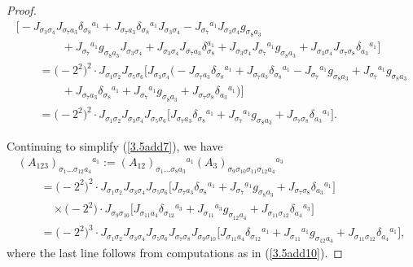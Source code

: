 \documentclass[10pt,a4paper]{amsart}
\numberwithin{equation}{section}
\theoremstyle{definition}
\begin{document}
\begin{proof}
\begin{gather}
\bigl[-J_{\sigma_3 \sigma_4} J_{\sigma_7 a_3} \delta_{\sigma_8}{}^{a_1}
+J_{\sigma_7 a_3} \delta_{\sigma_8}{}^{a_1} J_{\sigma_3 \sigma_4}
-J_{\sigma_7}{}^{a_1} J_{\sigma_3 \sigma_4} g_{\sigma_8 a_3}
 \nonumber\\
 \qquad\qquad{} +J_{\sigma_7}{}^{a_1} g_{\sigma_8 a_3} J_{\sigma_3 \sigma_4}
+J_{\sigma_3 \sigma_4} J_{\sigma_7 a_3} \delta_{\sigma_8}^{a_1}
+J_{\sigma_3 \sigma_4} J_{\sigma_7}{}^{a_1} g_{\sigma_8 a_3}
+J_{\sigma_3 \sigma_4} J_{\sigma_7 \sigma_8} \delta_{a_3}{}^{a_1}\bigr]
 \nonumber\\
\qquad{}=
\bigl(-2^2\bigr)^2\cdot J_{\sigma_1 \sigma_2} J_{\sigma_5 \sigma_6}
\bigl[ J_{\sigma_3 \sigma_4}
\bigl(-J_{\sigma_7 a_3} \delta_{\sigma_8}{}^{a_1}
+J_{\sigma_7 a_3} \delta_{\sigma_8}{}^{a_1}
-J_{\sigma_7}{}^{a_1} g_{\sigma_8 a_3}
+J_{\sigma_7}{}^{a_1} g_{\sigma_8 a_3}
\nonumber\\
\qquad\qquad{} +J_{\sigma_7 a_3} \delta_{\sigma_8}{}^{a_1} +J_{\sigma_7}{}^{a_1} g_{\sigma_8 a_3}
+J_{\sigma_7 \sigma_8} \delta_{a_3}{}^{a_1}\bigr) \bigr]
\nonumber\\
\qquad{}= \bigl(-2^2\bigr)^2 \cdot J_{\sigma_1 \sigma_2} J_{\sigma_3 \sigma_4}
J_{\sigma_5 \sigma_6}
\bigl[J_{\sigma_7 a_3} \delta_{\sigma_8}{}^{a_1}
+J_{\sigma_7}{}^{a_1} g_{\sigma_8 a_3}
+J_{\sigma_7 \sigma_8} \delta_{a_3}{}^{a_1}\bigr].\label{3.5add10}
\end{gather}



Continuing to simplify (\ref{3.5add7}), we have
\begin{gather*}
 {(A_{123})_{\sigma_1\dots\sigma_{12}a_4}{}^{a_1}
:= (A_{12})_{\sigma_1 \dots \sigma_8 a_3}{}^{a_1}
 ({A_3})_{\sigma_9 \sigma_{10} \sigma_{11} \sigma_{12} a_4}{}^{a_3} }\\
\qquad{} = \bigl(-2^2\bigr)^2 \cdot J_{\sigma_1 \sigma_2} J_{\sigma_3 \sigma_4}J_{\sigma_5 \sigma_6}
\bigl[J_{\sigma_7 a_3} \delta_{\sigma_8}{}^{a_1}
+J_{\sigma_7}{}^{a_1} g_{\sigma_8 a_3}
+J_{\sigma_7 \sigma_8} \delta_{a_3}{}^{a_1}\bigr]\\
\qquad\quad{} \times \bigl(-2^2\bigr)\cdot J_{\sigma_9\sigma_{10}}\bigl[J_{\sigma_{11}a_4}\delta_{\sigma_{12}}{}^{a_3}
+J_{\sigma_{11}}{}^{a_3} g_{\sigma_{12} a_4} + J_{\sigma_{11}\sigma_{12}}\delta_{a_4}{}^{a_3}\bigr]\\
\qquad{}= \bigl(-2^2\bigr)^3\cdot J_{\sigma_1 \sigma_2} J_{\sigma_3 \sigma_4}J_{\sigma_5 \sigma_6} J_{\sigma_7 \sigma_8}
J_{\sigma_9 \sigma_{10}}
\bigl[J_{\sigma_{11}a_4}\delta_{\sigma_{12}}{}^{a_1}+ J_{\sigma_{11}}{}^{a_1}g_{\sigma_{12}a_4} + J_{\sigma_{11}\sigma_{12}}\delta_{a_4}{}^{a_1}\bigr],
\end{gather*}
where the last line follows from computations as in (\ref{3.5add10}).


\end{proof}
\end{document}
